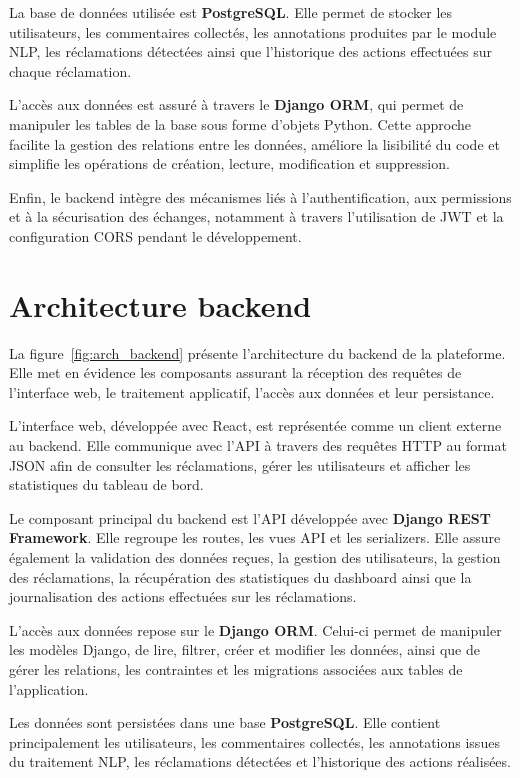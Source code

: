 \documentclass[12pt,a4paper,oneside]{report}
\begin{document}
La base de données utilisée est \textbf{PostgreSQL}. Elle permet de stocker les utilisateurs, les commentaires collectés, les annotations produites par le module NLP, les réclamations détectées ainsi que l’historique des actions effectuées sur chaque réclamation.

L’accès aux données est assuré à travers le \textbf{Django ORM}, qui permet de manipuler les tables de la base sous forme d’objets Python. Cette approche facilite la gestion des relations entre les données, améliore la lisibilité du code et simplifie les opérations de création, lecture, modification et suppression.

Enfin, le backend intègre des mécanismes liés à l’authentification, aux permissions et à la sécurisation des échanges, notamment à travers l’utilisation de JWT et la configuration CORS pendant le développement.

\section{Architecture backend}

La figure~\ref{fig:arch_backend} présente l’architecture du backend de la plateforme. Elle met en évidence les composants assurant la réception des requêtes de l’interface web, le traitement applicatif, l’accès aux données et leur persistance.

L’interface web, développée avec React, est représentée comme un client externe au backend. Elle communique avec l’API à travers des requêtes HTTP au format JSON afin de consulter les réclamations, gérer les utilisateurs et afficher les statistiques du tableau de bord.

Le composant principal du backend est l’API développée avec \textbf{Django REST Framework}. Elle regroupe les routes, les vues API et les serializers. Elle assure également la validation des données reçues, la gestion des utilisateurs, la gestion des réclamations, la récupération des statistiques du dashboard ainsi que la journalisation des actions effectuées sur les réclamations.

L’accès aux données repose sur le \textbf{Django ORM}. Celui-ci permet de manipuler les modèles Django, de lire, filtrer, créer et modifier les données, ainsi que de gérer les relations, les contraintes et les migrations associées aux tables de l’application.

Les données sont persistées dans une base \textbf{PostgreSQL}. Elle contient principalement les utilisateurs, les commentaires collectés, les annotations issues du traitement NLP, les réclamations détectées et l’historique des actions réalisées.
\end{document}
